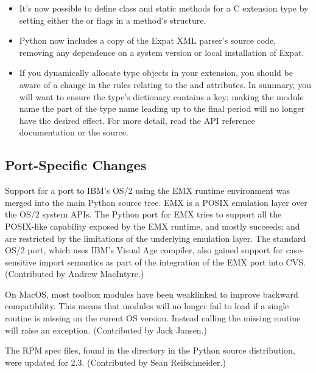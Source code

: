 \documentclass{howto}
\begin{document}
\begin{itemize}
\item It's now possible to define class and static methods for a C
extension type by setting either the  or
 flags in a method's 
structure.

\item Python now includes a copy of the Expat XML parser's source code,
removing any dependence on a system version or local installation of
Expat.

\item If you dynamically allocate type objects in your extension, you
should be aware of a change in the rules relating to the
 and  attributes.  In summary,
you will want to ensure the type's dictionary contains a
 key; making the module name the part of the type
name leading up to the final period will no longer have the desired
effect.  For more detail, read the API reference documentation or the 
source.

\end{itemize}


\subsection{Port-Specific Changes}

Support for a port to IBM's OS/2 using the EMX runtime environment was
merged into the main Python source tree.  EMX is a POSIX emulation
layer over the OS/2 system APIs.  The Python port for EMX tries to
support all the POSIX-like capability exposed by the EMX runtime, and
mostly succeeds;  and  are
restricted by the limitations of the underlying emulation layer.  The
standard OS/2 port, which uses IBM's Visual Age compiler, also gained
support for case-sensitive import semantics as part of the integration
of the EMX port into CVS.  (Contributed by Andrew MacIntyre.)

On MacOS, most toolbox modules have been weaklinked to improve
backward compatibility.  This means that modules will no longer fail
to load if a single routine is missing on the curent OS version.
Instead calling the missing routine will raise an exception.
(Contributed by Jack Jansen.)

The RPM spec files, found in the  directory in the
Python source distribution, were updated for 2.3.  (Contributed by
Sean Reifschneider.)
\end{document}
